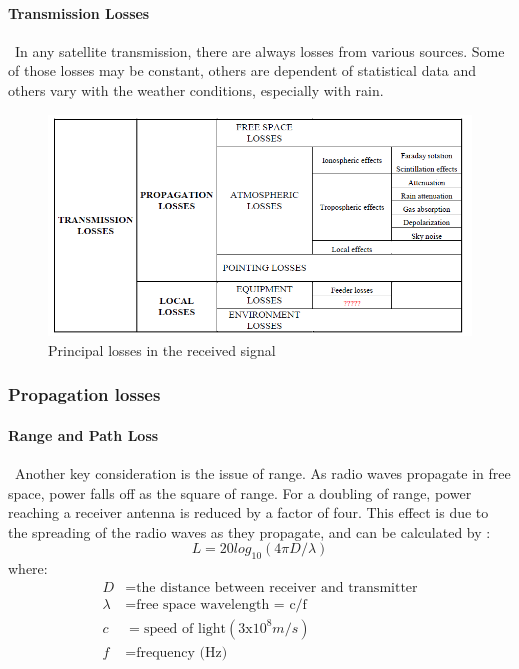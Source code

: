 \paragraph{Transmission Losses}
\ In any satellite transmission, there are always losses from various sources. Some of
those losses may be constant, others are dependent of statistical data and others vary
with the weather conditions, especially with rain.

\begin{figure}[h]
	\includegraphics[scale=0.8]{./sections/SatelliteDesign/images/principal_losses}
	\centering
	\caption{Principal losses in the received signal \cite{Jorge2012}}
	\label{principal_losses}
\end{figure}

\subsubsection{Propagation losses}
\paragraph{Range and Path Loss}
\
Another key consideration is the issue of range. As radio
waves propagate in free space, power falls off as the square
of range. For a doubling of range, power reaching a receiver
antenna is reduced by a factor of four. This effect is due to
the spreading of the radio waves as they propagate, and can
be calculated by \cite{Note1998}:
\begin{equation}
L=20log_{10}(4\pi D/\lambda)
\label{FSP}
\end{equation}
where:
\begin{align*}
	D&= \text{the distance between receiver and transmitter}\\
	\lambda&= \text{free space wavelength = c/f}\\
	c&= \text{speed of light}(3\mathrm{x}10^8m/s)\\
	f&= \text{frequency (Hz)}
\end{align*}
\clearpage
{}
